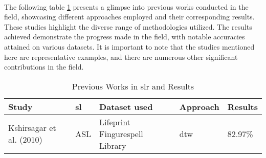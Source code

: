 \paragraph{}
The following table \ref{tab:previous-works} presents a glimpse into previous works conducted in the field, showcasing different approaches employed and their corresponding results. These studies highlight the diverse range of methodologies utilized. The results achieved demonstrate the progress made in the field, with notable accuracies attained on various datasets. It is important to note that the studies mentioned here are representative examples, and there are numerous other significant contributions in the field.
\begin{table}[h]
	\centering
	\label{tab:previous-works}
	\caption{Previous Works in \ac{slr} and Results}
	\begin{tabular}{|p{}|p{}|p{}|p{}|p{}|}
		\hline
		\textbf{Study} & \textbf{\ac{sl}} & \textbf{Dataset used} & \textbf{Approach} & \textbf{Results} \\
		\hline
		Kshirsagar et al. (2010) \cite{5656963} & ASL & Lifeprint Fingurespell Library & \ac{dtw} & 82.97\% \\
		\hline
	\end{tabular}
\end{table}
